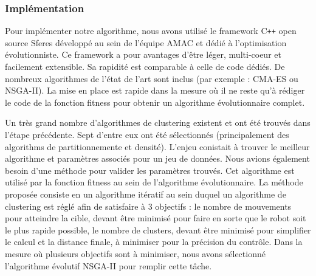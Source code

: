 \documentclass{llncs}
\newcommand*\circled[1]{\tikz[baseline=(char.base)]{
            \node[shape=circle,draw,inner sep=2pt] (char) {#1};}}
\begin{document}
%






\subsubsection{Implémentation}
Pour implémenter notre algorithme, nous avons utilisé le framework C{}\verb!++! open source Sferes \cite{Mouret2010} développé au sein de l'équipe AMAC et dédié à l'optimisation évolutionniste. Ce framework a pour avantages d'être léger, multi-coeur et facilement extensible. Sa rapidité est comparable à celle de code dédiés. De nombreux algorithmes de l'état de l'art sont inclus (par exemple : CMA-ES ou NSGA-II). La mise en place est rapide dans la mesure où il ne reste qu'à rédiger le code de la fonction fitness pour obtenir un algorithme évolutionnaire complet.



Un très grand nombre d'algorithmes de clustering existent et ont été trouvés dans l'étape précédente. Sept d'entre eux ont été sélectionnés (principalement des algorithms de partitionnemente et densité). L'enjeu conistait à trouver le meilleur algorithme et paramètres associés pour un jeu de données. Nous avions également besoin d'une méthode pour valider les paramètres trouvés. Cet algorithme est utilisé par la fonction fitness au sein de l'algorithme évolutionnaire. La méthode proposée consiste en un algorithme itératif au sein duquel un algorithme de clustering est réglé afin de satisfaire à 3 objectifs : \circled{1} le nombre de mouvements pour atteindre la cible, devant être minimisé pour faire en sorte que le robot soit le plus rapide possible, \circled{2} le nombre de clusters, devant être minimisé pour simplifier le calcul et \circled{3} la distance finale, à minimiser pour la précision du contrôle. Dans la mesure où plusieurs objectifs sont à minimiser, nous avons sélectionné l'algorithme évolutif NSGA-II\cite{Deb:2002:FEM:2221359.2221582} pour remplir cette tâche.
\end{document}
